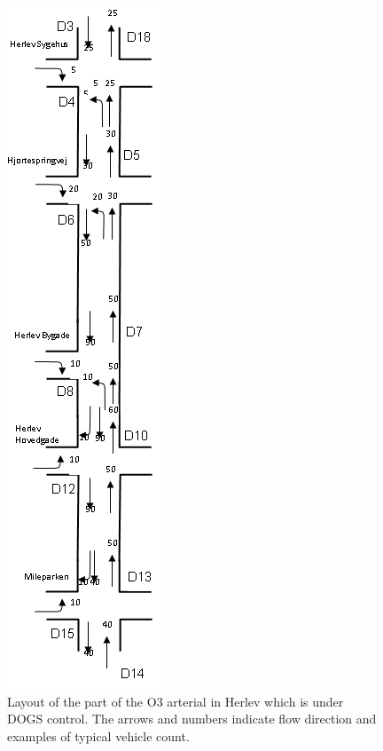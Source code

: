 \documentclass [a4paper, 10pt]{article}
\begin{document}
\begin{figure}[!ht]
\begin{center}
\includegraphics[scale=0.5,angle=90]{dogs_herlev.png} 
\end{center}
\caption{Layout of the part of the O3 arterial in Herlev which is under DOGS control. The arrows and numbers indicate flow direction and examples of typical vehicle count.}
\label{fig:dogs_herlev}
\end{figure}
\end{document}
